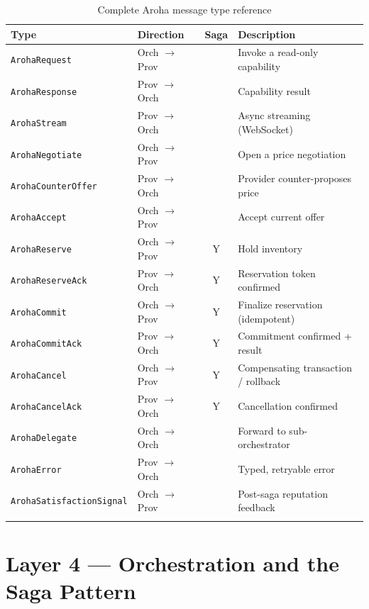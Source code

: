 \documentclass[11pt,a4paper]{article}
\begin{document}
\begin{longtable}{@{} l l c X @{}}
  \toprule
  \textbf{Type} & \textbf{Direction} & \textbf{Saga} & \textbf{Description} \\
  \midrule
  \endhead
  \texttt{ArohaRequest}            & Orch $\to$ Prov  &   & Invoke a read-only capability \\
  \texttt{ArohaResponse}           & Prov $\to$ Orch  &   & Capability result \\
  \texttt{ArohaStream}             & Prov $\to$ Orch  &   & Async streaming (WebSocket) \\
  \texttt{ArohaNegotiate}          & Orch $\to$ Prov  &   & Open a price negotiation \\
  \texttt{ArohaCounterOffer}       & Prov $\to$ Orch  &   & Provider counter-proposes price \\
  \texttt{ArohaAccept}             & Orch $\to$ Prov  &   & Accept current offer \\
  \texttt{ArohaReserve}            & Orch $\to$ Prov  & Y & Hold inventory \\
  \texttt{ArohaReserveAck}         & Prov $\to$ Orch  & Y & Reservation token confirmed \\
  \texttt{ArohaCommit}             & Orch $\to$ Prov  & Y & Finalize reservation (idempotent) \\
  \texttt{ArohaCommitAck}          & Prov $\to$ Orch  & Y & Commitment confirmed + result \\
  \texttt{ArohaCancel}             & Orch $\to$ Prov  & Y & Compensating transaction / rollback \\
  \texttt{ArohaCancelAck}          & Prov $\to$ Orch  & Y & Cancellation confirmed \\
  \texttt{ArohaDelegate}           & Orch $\to$ Orch  &   & Forward to sub-orchestrator \\
  \texttt{ArohaError}              & Prov $\to$ Orch  &   & Typed, retryable error \\
  \texttt{ArohaSatisfactionSignal} & Orch $\to$ Prov  &   & Post-saga reputation feedback \\
  \bottomrule
  \caption{Complete Aroha message type reference}
\end{longtable}

\section{Layer 4 --- Orchestration and the Saga Pattern}
\end{document}
